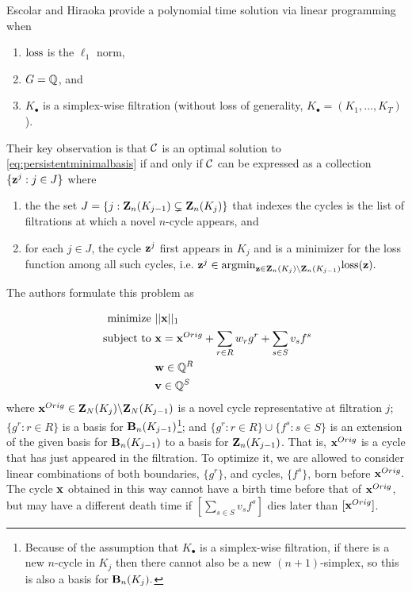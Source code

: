 Escolar and Hiraoka \cite{Escolar2016} provide a polynomial time solution via linear programming when
    \begin{enumerate}
        \item $\mathrm{loss}$ is the $\ell_1$ norm,
        \item $G = \mathbb{Q}$, and
        \item $K_\bullet$ is a simplex-wise filtration (without loss of generality, $K_\bullet = (K_1, \ldots, K_T)$).
    \end{enumerate}
    
 
Their key observation is that $\mathcal{C}$ is an optimal solution to \pr \eqref{eq:persistentminimalbasis} if and only if $\mathcal{C}$ can be expressed as a collection $\{{\mathbf z}^j : j \in J\}$ where  \begin{enumerate}
    \item the the set $J = \{j :  \mathbf{Z}_n(K_{j-1}) \subsetneq \mathbf{Z}_n(K_j) \}$ that indexes the cycles is the list of filtrations at which a novel $n$-cycle appears, and
    \item for each $j \in J$, the cycle ${\mathbf z}^j$ first appears in $K_j$ and is a minimizer for the loss function among all such cycles, i.e. ${\mathbf z}^j \in \mathrm{argmin}_{{\mathbf z} \in \mathbf{Z}_n(K_j) \backslash \mathbf{Z}_n(K_{j-1})} \mathrm{loss}({\mathbf z}).$
\end{enumerate}
The authors formulate this problem as 

 
\begin{align}
\begin{split}
\text{minimize } & ||\mathbf{x} ||_1  \\
\text{ subject to } & \mathbf{x} = \mathbf{x}^{Orig} + \sum_{r\in R} w_r g^r + \sum_{s \in S} v_s f^s \\
& \mathbf{w} \in \mathbb{Q}^R  \\
& \mathbf{v} \in \mathbb{Q}^S
\end{split}
\label{eq:escolarargmin}
\end{align}
where $\mathbf{x}^{Orig} \in\mathbf{Z}_N(K_j) \backslash \mathbf{Z}_N(K_{j-1})$ is a novel cycle representative at filtration $j$; $\{g^r : r \in R\}$ is a basis for $\mathbf{B}_n(K_{j-1})$\footnote{Because of the assumption that $K_\bullet$ is a simplex-wise filtration, if there is a new $n$-cycle in $K_j$ then there cannot also be a new $(n+1)$-simplex, so this is also a basis for $\mathbf{B}_n(K_j).$}; and $\{g^r : r \in R\} \cup \{f^s : s \in S\}$ is an extension of the given basis for $\mathbf{B}_n(K_{j-1})$ to a basis for $\mathbf{Z}_n(K_{j-1})$. That is, $\mathbf{x}^{Orig}$ is a cycle that has just appeared in the filtration. To optimize it, we are allowed to consider linear combinations of both boundaries, $\{g^r\}$, and cycles, $\{f^s\}$, born before $\mathbf{x}^{Orig}.$ The cycle $\mathbf{x}$ obtained in this way cannot have a birth time before that of $\mathbf{x}^{Orig}$, but may have a different death time if $[\sum_{s\in S}v_sf^s]$ dies later than $[\mathbf{x}^{Orig}]$. 


